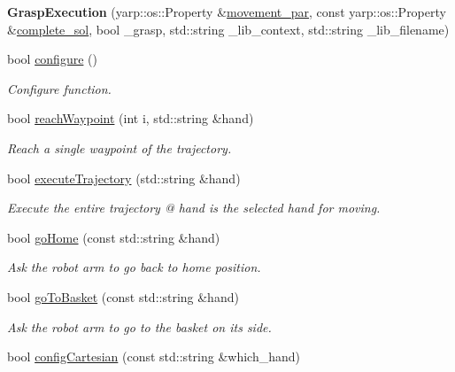 \begin{DoxyCompactItemize}
\item 
{\bfseries Grasp\+Execution} (yarp\+::os\+::\+Property \&\hyperlink{classGraspExecution_a04447d31aa166b06a1cd4bb3f78f037d}{movement\+\_\+par}, const yarp\+::os\+::\+Property \&\hyperlink{classGraspExecution_a2f8d04ef2258f2dcc24ca3e68940e76d}{complete\+\_\+sol}, bool \+\_\+grasp, std\+::string \+\_\+lib\+\_\+context, std\+::string \+\_\+lib\+\_\+filename)\label{classGraspExecution_a536f737ceb327ce074ed9bdcd159be8d}

\item 
bool \hyperlink{classGraspExecution_a65dfa2f0a46e106bdc42e40e5282d46a}{configure} ()
\begin{DoxyCompactList}\small\item\em Configure function. \end{DoxyCompactList}\item 
bool \hyperlink{classGraspExecution_a1c53f81a101ea05e6c4bf3ad49329705}{reach\+Waypoint} (int i, std\+::string \&hand)
\begin{DoxyCompactList}\small\item\em Reach a single waypoint of the trajectory. \end{DoxyCompactList}\item 
bool \hyperlink{classGraspExecution_a3e8874281c526a591d3e3b4301b6f013}{execute\+Trajectory} (std\+::string \&hand)
\begin{DoxyCompactList}\small\item\em Execute the entire trajectory @ hand is the selected hand for moving. \end{DoxyCompactList}\item 
bool \hyperlink{classGraspExecution_af5b1eca953b18c03cddbaea699dd921d}{go\+Home} (const std\+::string \&hand)
\begin{DoxyCompactList}\small\item\em Ask the robot arm to go back to home position. \end{DoxyCompactList}\item 
bool \hyperlink{classGraspExecution_a28f36f843baee76b9ec350244fd33694}{go\+To\+Basket} (const std\+::string \&hand)
\begin{DoxyCompactList}\small\item\em Ask the robot arm to go to the basket on its side. \end{DoxyCompactList}\item 
bool \hyperlink{classGraspExecution_a992439076c5e187baa7f8fb88a8ee69c}{config\+Cartesian} (const std\+::string \&which\+\_\+hand)

\end{DoxyCompactItemize}
